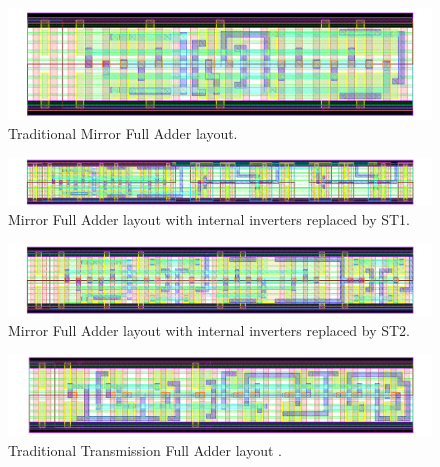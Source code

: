 \documentclass[pgmicro,mestrado,english]{iiufrgs}
\begin{document}
\begin{figure}[H]
\centering
\includegraphics[width=1.5\textwidth, angle =90]{CMOS.png}
\caption{Traditional Mirror Full Adder layout.}
\label{fig:CMOS}
\end{figure}

\newpage
\begin{figure}[H]
\centering
\includegraphics[width=1.5\textwidth, angle =90]{CMOSST1.png}
\caption{Mirror Full Adder layout with internal inverters replaced by ST1.}
\label{fig:CMOSST1}
\end{figure}

\newpage
\begin{figure}[H]
\centering
\includegraphics[width=1.5\textwidth, angle =90]{CMOSST2.png}
\caption{Mirror Full Adder layout with internal inverters replaced by ST2.}
\label{fig:CMOSST2}
\end{figure}





\newpage
\begin{figure}[H]
\centering
\includegraphics[width=1.5\textwidth, angle =90]{TFA.png}
\caption{Traditional Transmission Full Adder layout .}
\label{fig:TFA}
\end{figure}
\end{document}
